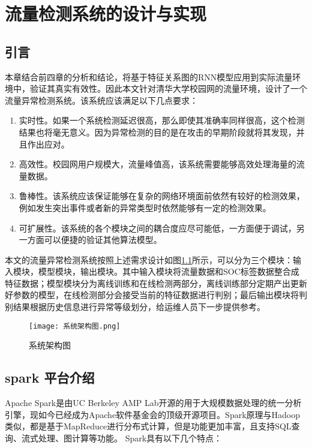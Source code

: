 \chapter{流量检测系统的设计与实现}
\section{引言}
本章结合前四章的分析和结论，将基于特征关系图的RNN模型应用到实际流量环境中，验证其真实有效性。因此本文针对清华大学校园网的流量环境，设计了一个流量异常检测系统。该系统应该满足以下几点要求：
\begin{enumerate}
  \item 实时性。如果一个系统检测延迟很高，那么即使其准确率同样很高，这个检测结果也将毫无意义。因为异常检测的目的是在攻击的早期阶段就将其发现，并且作出应对。
  \item 高效性。校园网用户规模大，流量峰值高，该系统需要能够高效处理海量的流量数据。
  \item 鲁棒性。该系统应该保证能够在复杂的网络环境面前依然有较好的检测效果，例如发生突出事件或者新的异常类型时依然能够有一定的检测效果。
  \item 可扩展性。该系统的各个模块之间的耦合度应尽可能低，一方面便于调试，另一方面可以便捷的验证其他算法模型。
\end{enumerate}

本文的流量异常检测系统按照上述需求设计如图\ref{fig:arch}所示，可以分为三个模块：输入模块，模型模块，输出模块。其中输入模块将流量数据和SOC标签数据整合成特征数据；模型模块分为离线训练和在线检测两部分，离线训练部分定期产出更新好参数的模型，在线检测部分会接受当前的特征数据进行判别；最后输出模块将判别结果根据历史信息进行异常等级划分，给运维人员下一步提供参考。
\begin{figure}
    \centering
    \texttt{[image: 系统架构图.png]}
    \caption{系统架构图}
    \label{fig:arch}
  \end{figure}




\section{spark 平台介绍}
Apache Spark是由UC Berkeley AMP Lab开源的用于大规模数据处理的统一分析引擎\cite{spark}，现如今已经成为Apache软件基金会的顶级开源项目。Spark原理与Hadoop类似，都是基于MapReduce进行分布式计算，但是功能更加丰富，且支持SQL查询、流式处理、图计算等功能。
Spark具有以下几个特点：

